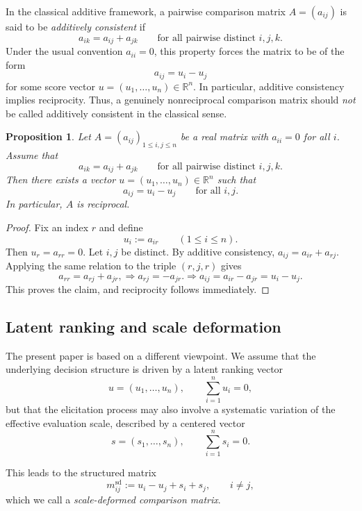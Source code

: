 \documentclass[11pt]{amsart}
\theoremstyle{definition}
\theoremstyle{plain}
\newtheorem{proposition}[definition]{Proposition}
\numberwithin{equation}{section}
\begin{document}
In the classical additive framework, a pairwise comparison matrix $A=(a_{ij})$ is said to be \emph{additively consistent} if
\begin{equation}\label{eq:addconsistency}
a_{ik}=a_{ij}+a_{jk}
\qquad
\text{for all pairwise distinct } i,j,k.
\end{equation}
Under the usual convention $a_{ii}=0$, this property forces the matrix to be of the form
\[
a_{ij}=u_i-u_j
\]
for some score vector $u=(u_1,\dots,u_n)\in\mathbb R^n$. In particular, additive consistency implies reciprocity.
Thus, a genuinely nonreciprocal comparison matrix should \emph{not} be called additively consistent in the classical sense.

\begin{proposition}
Let $A=(a_{ij})_{1\le i,j\le n}$ be a real matrix with $a_{ii}=0$ for all $i$. Assume that
\[
a_{ik}=a_{ij}+a_{jk}
\qquad
\text{for all pairwise distinct } i,j,k.
\]
Then there exists a vector $u=(u_1,\dots,u_n)\in\mathbb R^n$ such that
\[
a_{ij}=u_i-u_j
\qquad
\text{for all } i,j.
\]
In particular, $A$ is reciprocal.
\end{proposition}

\begin{proof}
Fix an index $r$ and define
\[
u_i:=a_{ir}
\qquad (1\le i\le n).
\]
Then $u_r=a_{rr}=0$. Let $i,j$ be distinct. By additive consistency,
\(
a_{ij}=a_{ir}+a_{rj}.
\)
Applying the same relation to the triple $(r,j,r)$ gives
\[
a_{rr}=a_{rj}+a_{jr},
\Rightarrow
a_{rj}=-a_{jr}.
\Rightarrow
a_{ij}=a_{ir}-a_{jr}=u_i-u_j.
\]
This proves the claim, and reciprocity follows immediately.
\end{proof}

\subsection{Latent ranking and scale deformation}

The present paper is based on a different viewpoint. We assume that the underlying decision structure is driven by a latent ranking vector
\[
u=(u_1,\dots,u_n),
\qquad
\sum_{i=1}^n u_i=0,
\]
but that the elicitation process may also involve a systematic variation of the effective evaluation scale, described by a centered vector
\[
s=(s_1,\dots,s_n),
\qquad
\sum_{i=1}^n s_i=0.
\]

This leads to the structured matrix
\begin{equation}\label{eq:scaledeformed}
m_{ij}^{\mathrm{sd}}:=u_i-u_j+s_i+s_j,
\qquad i\neq j,
\end{equation}
which we call a \emph{scale-deformed comparison matrix}.
\end{document}
